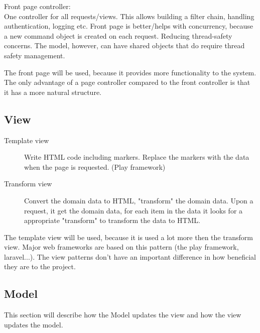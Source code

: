 Front page controller:\\
One controller for all requests/views. This allows building a filter chain, handling authentication, logging etc.
Front page is better/helps with concurrency, because a new command object is created on each request. Reducing thread-safety concerns. The model, however, can have shared objects that do require thread safety management.

The front page will be used, because it provides more functionality to the system. The only advantage of a page controller compared to the front controller is that it has a more natural structure.

\subsection{View}

\begin{description}
\item [Template view] Write HTML code including markers. Replace the markers with the data when the page is requested. (Play framework)
\item [Transform view] Convert the domain data to HTML, "transform" the domain data. Upon a request, it get the domain data, for each item in the data it looks for a appropriate "transform" to transform the data to HTML.
\end{description}

The template view will be used, because it is used a lot more then the transform view. Major web frameworks are based on this pattern (the play framework, laravel...). The view patterns don't have an important difference in how beneficial they are to the project.


\subsection{Model}
%
This section will describe how the Model updates the view and how the view updates the model.

